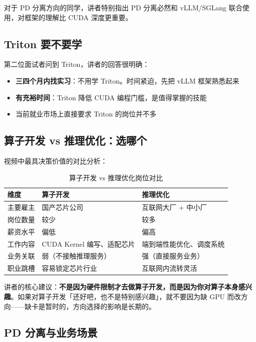 \documentclass[a4paper]{article}
\begin{document}
对于 PD 分离方向的同学，讲者特别指出 PD 分离必然和 vLLM/SGLang 联合使用，对框架的理解比 CUDA 深度更重要。

\subsection{Triton 要不要学}

第二位面试者问到 Triton，讲者的回答很明确：
\begin{itemize}
  \item \textbf{三四个月内找实习}：不用学 Triton。时间紧迫，先把 vLLM 框架熟悉起来
  \item \textbf{有充裕时间}：Triton 降低 CUDA 编程门槛，是值得掌握的技能
  \item 当前就业市场上直接要求 Triton 的岗位并不多
\end{itemize}

\subsection{算子开发 vs 推理优化：选哪个}

视频中最具决策价值的对比分析：

\begin{table}[H]
\centering
\begin{tabular}{p{3.5cm}p{5cm}p{5cm}}
\toprule
\textbf{维度} & \textbf{算子开发} & \textbf{推理优化} \\
\midrule
主要雇主 & 国产芯片公司 & 互联网大厂 + 中小厂 \\
岗位数量 & 较少 & 较多 \\
薪资水平 & 偏低 & 偏高 \\
工作内容 & CUDA Kernel 编写、适配芯片 & 端到端性能优化、调度系统 \\
业务关联 & 弱（不接触推理服务） & 强（直接服务业务） \\
职业跳槽 & 容易锁定芯片行业 & 互联网内流转灵活 \\
\bottomrule
\end{tabular}
\caption{算子开发 vs 推理优化岗位对比}
\end{table}

讲者的核心建议：\textbf{不是因为硬件限制才去做算子开发，而是因为你对算子本身感兴趣}。如果对算子开发「还好吧，也不是特别感兴趣」，就不要因为缺 GPU 而改方向——缺卡是暂时的，方向选择的影响是长期的。

\subsection{PD 分离与业务场景}
\end{document}
